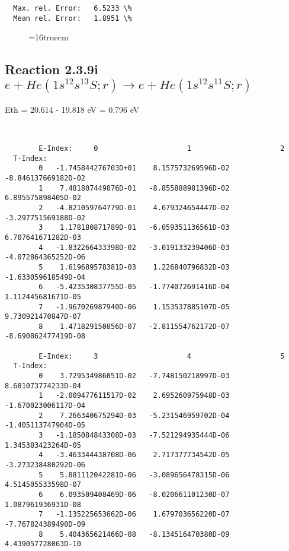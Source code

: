 \documentclass[12pt,dvipdfmx]{article}
\begin{document}
{\begin{small}
\begin{verbatim}
  Max. rel. Error:   6.5233 \%
  Mean rel. Error:   1.8951 \%

\end{verbatim}\end{small}
\begin{figure} \label{2.3.9h}
\epsfxsize=16truecm
\end{figure}
\newpage



\subsection{
Reaction 2.3.9i $ e + He(1s^12s^13S;r) \rightarrow e + He(1s^12s^11S;r) $
}
Eth = 20.614 - 19.818 eV = 0.796 eV

\begin{small}\begin{verbatim}


        E-Index:     0                     1                     2
  T-Index:
        0   -1.745844276703D+01    8.157573269596D-02   -8.846137669182D-02
        1    7.481807449876D-01   -8.855888981396D-02    6.895575898405D-02
        2   -4.821059764779D-01    4.679324654447D-02   -3.297751569188D-02
        3    1.178180871789D-01   -6.059351136561D-03    6.707641671282D-03
        4   -1.832266433398D-02   -3.019133239406D-03   -4.072864365252D-06
        5    1.619689578381D-03    1.226840796832D-03   -1.633059618549D-04
        6   -5.423530837755D-05   -1.774072691416D-04    1.112445681671D-05
        7   -1.967026987940D-06    1.153537885107D-05    9.730921470847D-07
        8    1.471829150856D-07   -2.811554762172D-07   -8.690862477419D-08

        E-Index:     3                     4                     5
  T-Index:
        0    3.729534986051D-02   -7.748150218997D-03    8.681073774233D-04
        1   -2.009477611517D-02    2.695260975948D-03   -1.670023006117D-04
        2    7.266340675294D-03   -5.231546959702D-04   -1.405113747904D-05
        3   -1.185084843308D-03   -7.521294935444D-06    1.345383423264D-05
        4   -3.463344438708D-06    2.717377734542D-05   -3.273238480292D-06
        5    5.881112042281D-06   -3.089656478315D-06    4.514505533598D-07
        6    6.093509408469D-06   -8.020661101230D-07    1.087961936931D-08
        7   -1.135225653662D-06    1.679703656220D-07   -7.767824389490D-09
        8    5.404365621466D-08   -8.134516470380D-09    4.439057728063D-10


\end{verbatim}
\end{small}}
\end{document}
